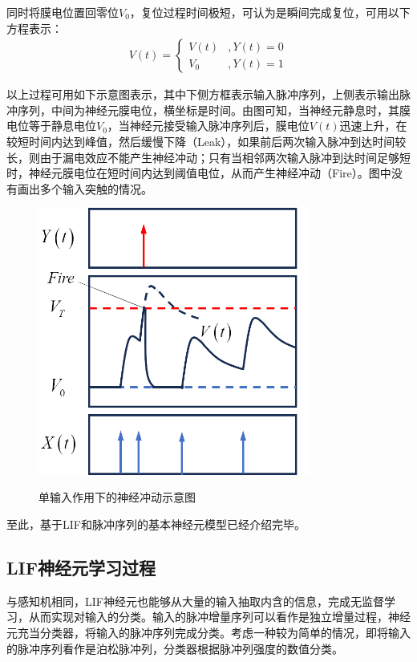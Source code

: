 \documentclass[11pt]{article}
\begin{document}
同时将膜电位置回零位$V_0$，复位过程时间极短，可认为是瞬间完成复位，可用以下方程表示：
\begin{align}
  V(t)=\left\{\begin{aligned}
                V(t) & ,Y(t)=0  \\
                V_0  & ,Y(t)= 1
              \end{aligned}\right.
  \label{eq:LIF复位过程}
\end{align}\par
以上过程可用如下示意图表示，其中下侧方框表示输入脉冲序列，上侧表示输出脉冲序列，中间为神经元膜电位，横坐标是时间。由图可知，当神经元静息时，其膜电位等于静息电位$V_0$，当神经元接受输入脉冲序列后，膜电位$V(t)$迅速上升，在较短时间内达到峰值，然后缓慢下降（Leak），如果前后两次输入脉冲到达时间较长，则由于漏电效应不能产生神经冲动；只有当相邻两次输入脉冲到达时间足够短时，神经元膜电位在短时间内达到阈值电位，从而产生神经冲动（Fire）。图中没有画出多个输入突触的情况。
\begin{figure}[H]
  \centering
  \includegraphics[width=0.8\textwidth]{神经冲动示意图.png}
  \label{fig:神经冲动示意图}
  \caption{单输入作用下的神经冲动示意图}
\end{figure}
至此，基于LIF和脉冲序列的基本神经元模型已经介绍完毕。

\subsection{LIF神经元学习过程}
与感知机相同，LIF神经元也能够从大量的输入抽取内含的信息，完成无监督学习，从而实现对输入的分类。输入的脉冲增量序列可以看作是独立增量过程，神经元充当分类器，将输入的脉冲序列完成分类。考虑一种较为简单的情况，即将输入的脉冲序列看作是泊松脉冲列\cite{ZhouYinQingSuiJiGuoChengLiLun2013,NIPS2009_a5cdd4aa}，分类器根据脉冲列强度的数值分类。\par
\end{document}
